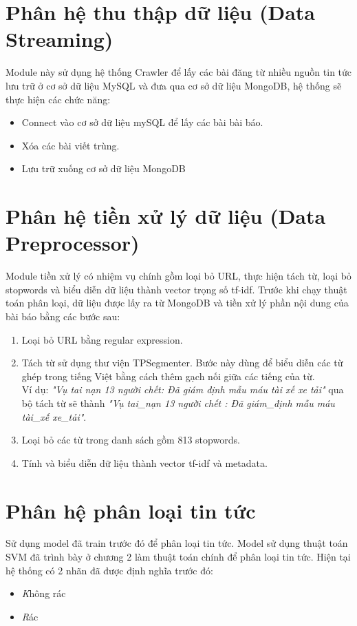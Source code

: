 \section{Phân hệ thu thập dữ liệu (Data Streaming)}
Module này sử dụng hệ thống Crawler để lấy các bài đăng từ nhiều nguồn tin tức lưu trữ ở cơ sở dữ liệu MySQL và đưa qua cơ sở dữ liệu MongoDB, hệ thống sẽ thực hiện các chức năng:
	\begin{itemize}
		\item Connect vào cơ sở dữ liệu mySQL để lấy các bài bài báo.
		\item Xóa các bài viết trùng.
		\item Lưu trữ xuống cơ sở dữ liệu MongoDB
	\end{itemize}
\section{Phân hệ tiền xử lý dữ liệu (Data Preprocessor)}
Module tiền xử lý có nhiệm vụ chính gồm loại bỏ URL, thực hiện tách từ, loại bỏ stopwords và biểu diễn dữ liệu thành vector trọng số tf-idf. Trước khi chạy thuật toán phân loại, dữ liệu được lấy ra từ MongoDB và tiền xử lý phần nội dung của bài báo bằng các bước sau:
	\begin{enumerate}
		\item Loại bỏ URL bằng regular expression.
		\item Tách từ sử dụng thư viện TPSegmenter. Bước này dùng để biểu diễn các từ ghép trong tiếng Việt bằng cách thêm gạch nối giữa các tiếng của từ.\\
		Ví dụ: \textit{"Vụ tai nạn 13 người chết: Đã giám định mẫu máu tài xế xe tải"} qua bộ tách từ sẽ thành \textit{"Vụ tai\_nạn 13 người chết : Đã giám\_định mẫu máu tài\_xế xe\_tải"}.
		\item Loại bỏ các từ trong danh sách gồm 813 stopwords.
		\item Tính và biểu diễn dữ liệu thành vector tf-idf và metadata.
	\end{enumerate}

\section{Phân hệ phân loại tin tức}
Sử dụng model đã train trước đó để phân loại tin tức. Model sử dụng thuật toán SVM đã trình bày ở chương 2 làm thuật toán chính để phân loại tin tức. Hiện tại hệ thống có 2 nhãn đã được định nghĩa trước đó:
	\begin{itemize}
		\item \textit Không rác
		\item \textit Rác
	\end{itemize}

